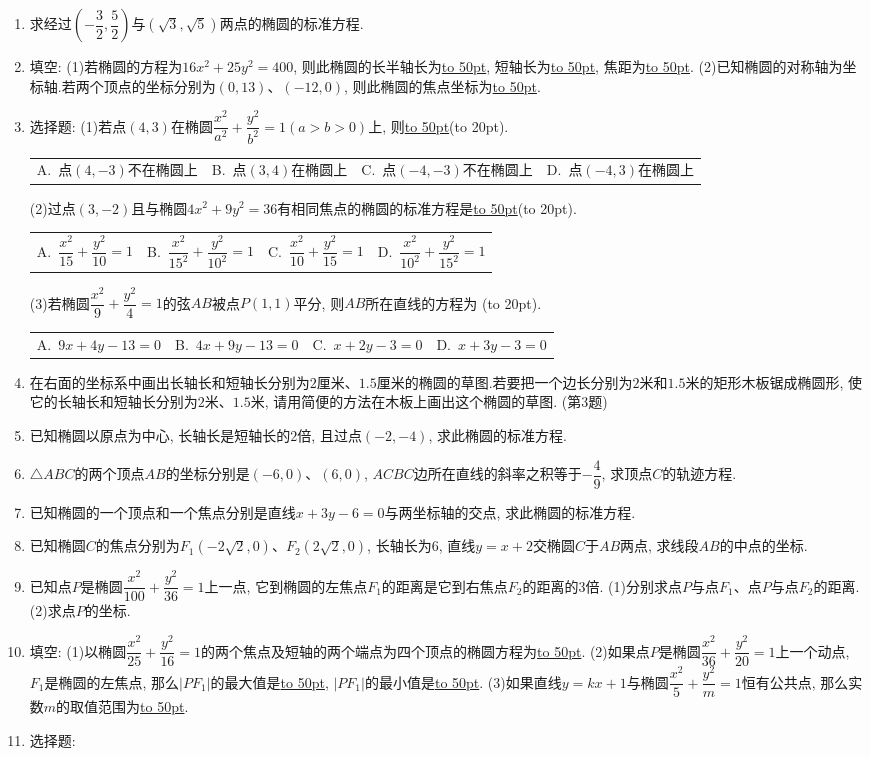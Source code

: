 \documentclass[10pt,a4paper]{article}
\newcommand{\blank}[1]{\underline{\hbox to #1pt{}}}
\newcommand{\bracket}[1]{(\hbox to #1pt{})}
\newcommand{\fourch}[4]{\par\begin{tabular}{p{.23\textwidth}p{.23\textwidth}p{.23\textwidth}p{.23\textwidth}}
A.~#1 &B.~#2& C.~#3& D.~#4
\end{tabular}}
\begin{document}
\begin{enumerate}[1.]
\item 求经过$(-\dfrac 32,\dfrac 52)$与$(\sqrt 3,\sqrt 5)$两点的椭圆的标准方程.
\item 填空:
(1)若椭圆的方程为$16x^2+25y^2=400$, 则此椭圆的长半轴长为\blank{50}, 短轴长为\blank{50}, 焦距为\blank{50}.
(2)已知椭圆的对称轴为坐标轴.若两个顶点的坐标分别为$(0,13)$、$(-12,0)$, 则此椭圆的焦点坐标为\blank{50}.
\item 选择题:
(1)若点$(4,3)$在椭圆$\dfrac{x^2}{a^2}+\dfrac{y^2}{b^2}=1(a>b>0)$上, 则\blank{50}\bracket{20}.
\fourch{点$(4,-3)$不在椭圆上}{点$(3,4)$在椭圆上}{点$(-4,-3)$不在椭圆上}{点$(-4,3)$在椭圆上}
(2)过点$(3,-2)$且与椭圆$4x^2+9y^2=36$有相同焦点的椭圆的标准方程是\blank{50}\bracket{20}.
\fourch{$\dfrac{x^2}{15}+\dfrac{y^2}{10}=1$}{$\dfrac{x^2}{{{15}^2}}+\dfrac{y^2}{{{10}^2}}=1$}{$\dfrac{x^2}{10}+\dfrac{y^2}{15}=1$}{$\dfrac{x^2}{{{10}^2}}+\dfrac{y^2}{{{15}^2}}=1$}
(3)若椭圆$\dfrac{x^2}9+\dfrac{y^2}4=1$的弦$AB$被点$P(1,1)$平分, 则$AB$所在直线的方程为    \bracket{20}.
\fourch{$9x+4y-13=0$}{$4x+9y-13=0$}{$x+2y-3=0$}{$x+3y-3=0$}
\item 在右面的坐标系中画出长轴长和短轴长分别为$2$厘米、$1.5$厘米的椭圆的草图.若要把一个边长分别为$2$米和$1.5$米的矩形木板锯成椭圆形, 使它的长轴长和短轴长分别为$2$米、$1.5$米, 请用简便的方法在木板上画出这个椭圆的草图.
(第3题)
\item 已知椭圆以原点为中心, 长轴长是短轴长的$2$倍, 且过点$(-2,-4)$, 求此椭圆的标准方程.
\item $\triangle ABC$的两个顶点$AB$的坐标分别是$(-6,0)$、$(6,0)$, $ACBC$边所在直线的斜率之积等于$-\dfrac 49$, 求顶点$C$的轨迹方程.
\item 已知椭圆的一个顶点和一个焦点分别是直线$x+3y-6=0$与两坐标轴的交点, 求此椭圆的标准方程.
\item 已知椭圆$C$的焦点分别为$F_1(-2\sqrt 2,0)$、$F_2(2\sqrt 2,0)$, 长轴长为$6$, 直线$y=x+2$交椭圆$C$于$AB$两点, 求线段$AB$的中点的坐标.
\item 已知点$P$是椭圆$\dfrac{x^2}{100}+\dfrac{y^2}{36}=1$上一点, 它到椭圆的左焦点$F_1$的距离是它到右焦点$F_2$的距离的$3$倍.
(1)分别求点$P$与点$F_1$、点$P$与点$F_2$的距离.
(2)求点$P$的坐标.
\item 填空:
(1)以椭圆$\dfrac{x^2}{25}+\dfrac{y^2}{16}=1$的两个焦点及短轴的两个端点为四个顶点的椭圆方程为\blank{50}.
(2)如果点$P$是椭圆$\dfrac{x^2}{36}+\dfrac{y^2}{20}=1$上一个动点, $F_1$是椭圆的左焦点, 那么$|PF_1|$的最大值是\blank{50}, $|PF_1|$的最小值是\blank{50}.
(3)如果直线$y=kx+1$与椭圆$\dfrac{x^2}5+\dfrac{y^2}m=1$恒有公共点, 那么实数$m$的取值范围为\blank{50}.
\item 选择题:

\end{enumerate}
\end{document}
